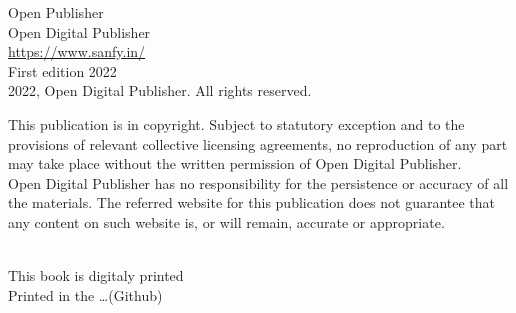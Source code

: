 
{	
	
 \raggedright
	Open Publisher\\
	Open Digital Publisher\\
	
	
	\url{https://www.sanfy.in/}\\

	
	
	First edition 2022\\[10mm]
	
	\textcopyright{} 2022, Open Digital Publisher. All rights reserved.\\[3mm]
	
	\begin{minipage}{0.85\linewidth}
		This publication is in copyright. Subject to statutory exception
		and to the provisions of relevant collective licensing agreements,
		no reproduction of any part may take place without the written
		permission of Open Digital Publisher.\\[-2mm]
		
		Open Digital Publisher has no responsibility for the persistence or accuracy of all the materials. The referred website for this publication does not guarantee that any content on such website is, or will remain, accurate or appropriate. 
	\end{minipage}
	\\[5mm]
	
	This book is digitaly printed\\
	Printed in the \ldots (Github)
	
}

\cleardoublepage









